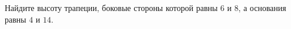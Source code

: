 \begin{ex}
	\begin{condition}
		Найдите высоту трапеции, боковые стороны которой равны \( 6  \) и \( 8 \), а основания равны \( 4  \) и \( 14 \).
	\end{condition}
\end{ex}